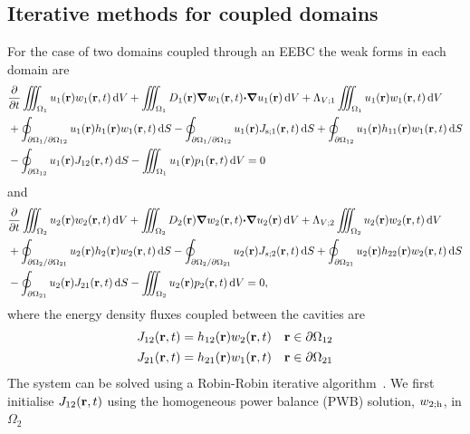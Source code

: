 \documentclass[a4paper]{article}
\numberwithin{equation}{section}
\providecommand\oiint{\oint}
\begin{document}
\subsection[Iterative methods for coupled domains]{Iterative methods for coupled domains}
\label{sc:fem:coup}

For the case of two domains coupled through an EEBC the weak forms in each domain are
\begin{align}
\label{eq:wf:coup1}
&\frac{{\partial}}{{\partial}t}\iiint_{\Omega_1} u_1\pr w_1\prt\dif{V}
+\iiint_{\Omega_1} D_1\pr{\vnabla}w_1\prt{\vcdot}{\vnabla}u_1\pr\dif{V}
+\Lambda_{V;1}\iiint_{\Omega_1} u_1\pr w_1\prt\dif{V} \nonumber\\
&+\oiint_{\partial\Omega_1/\partial\Omega_{12}} u_1\pr h_1\pr w_1\prt\dif{S}
-\oiint_{\partial\Omega_1/\partial\Omega_{12}} u_1\pr J_{\rs;1}\prt\dif{S}
+\oiint_{\partial\Omega_{12}} u_1\pr h_{11}\pr w_1\prt\dif{S} \nonumber \\
&-\oiint_{\partial\Omega_{12}} u_1\pr J_{12}\prt\dif{S}
-\iiint_{\Omega_1} u_1\pr p_1\prt\dif{V}=0
\end{align}
and
\begin{align}
\label{eq:wf:coup2}
&\frac{{\partial}}{{\partial}t}\iiint_{\Omega_2} u_2\pr w_2\prt\dif{V}
+\iiint_{\Omega_2} D_2\pr{\vnabla}w_2\prt{\vcdot}{\vnabla}u_2\pr\dif{V}
+\Lambda_{V;2}\iiint_{\Omega_2} u_2\pr w_2\prt\dif{V} \nonumber\\
&+\oiint_{\partial\Omega_2/\partial\Omega_{21}} u_2\pr h_2\pr w_2\prt\dif{S}
-\oiint_{\partial\Omega_2/\partial\Omega_{21}} u_2\pr J_{s;2}\prt\dif{S}
+\oiint_{\partial\Omega_{21}} u_2\pr h_{22}\pr w_2\prt\dif{S} \nonumber\\
&-\oiint_{\partial\Omega_{21}} u_2\pr J_{21}\prt\dif{S}
-\iiint_{\Omega_2} u_2\pr p_2\prt\dif{V}=0,
\end{align}
where the energy density fluxes coupled between the cavities are
\begin{align}
\label{eq:wf:coup:J12}
\begin{matrix}
J_{12}(\boldsymbol{\mathrm{r}},t) = h_{12}(\boldsymbol{\mathrm{r}}) w_2(\boldsymbol{\mathrm{r}},t) &\boldsymbol{\mathrm{r}}\in\partial\Omega_{12} 
\end{matrix}\\
\label{eq:wf:coup:J21}
\begin{matrix}
J_{21}(\boldsymbol{\mathrm{r}},t) = h_{21}(\boldsymbol{\mathrm{r}}) w_1(\boldsymbol{\mathrm{r}},t) &\boldsymbol{\mathrm{r}}\in\partial\Omega_{21}
\end{matrix}
\end{align}
The system can be solved using a Robin-Robin iterative algorithm~\citep{Discacciati2007}. We first initialise
$J_{12}(\boldsymbol{\mathrm{r}},t)$ using the homogeneous power balance (PWB) solution, $w_{2;\mathrm{h}}$,  in $\Omega_2$
\end{document}
